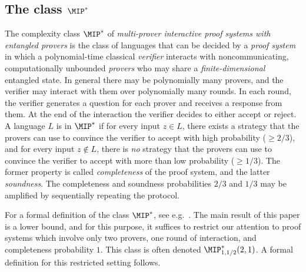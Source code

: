 \subsection{The class $\MIP^*$}

The complexity class $\MIP^*$ of \emph{multi-prover interactive proof
  systems with entangled provers} is the class of languages that can be
decided by a \emph{proof system} in which a polynomial-time classical
\emph{verifier} interacts with noncommunicating, computationally unbounded
 \emph{provers} who may share a \emph{finite-dimensional} entangled state. In general there may be polynomially many provers,
and the verifier may interact with them over polynomially many
rounds. In each round, the verifier generates a question for
each prover and receives a response from them. At the end of
the interaction the verifier 
decides to either accept or reject. A language $L$ is in $\MIP^*$ if for
every input $z \in L$, there exists a strategy that the provers can
use to convince the verifier to accept with high probability ($\geq 2/3$), and for every input $z \not\in L$, there is
\emph{no} strategy that the provers can use to convince the verifier
to accept with more than low probability ($\geq 1/3$). The former
property is called \emph{completeness} of the proof system, and the
latter \emph{soundness}. The
completeness and soundness probabilities $2/3$ and $1/3$ may be
amplified by sequentially repeating the protocol. 

For a formal definition of the class $\MIP^*$, see e.g.~\cite[Section
  6.1]{vidick2016quantum}. 
The main result of this paper is a lower bound, and for this purpose,
it suffices  to restrict our attention to proof
systems which involve only two provers, one round of interaction, and
completeness probability $1$. This class is often denoted $\MIP^*_{1,1/2}(2,1)$. A formal definition for this restricted setting follows. 

